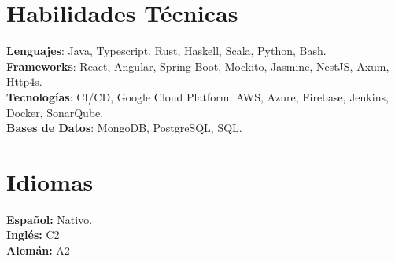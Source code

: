 \documentclass[letterpaper,11pt]{article}
\begin{document}
%
\section{Habilidades Técnicas}
 \begin{itemize}[leftmargin=0.15in, label={}]
    \small{\item{
     \textbf{Lenguajes}{: Java, Typescript, Rust, Haskell, Scala, Python, Bash.} \\
     \textbf{Frameworks}{: React, Angular, Spring Boot, Mockito, Jasmine, NestJS, Axum, Http4s. } \\
     \textbf{Tecnologías}{: CI/CD, Google Cloud Platform, AWS, Azure, Firebase, Jenkins, Docker, SonarQube.} \\
     \textbf{Bases de Datos}{: MongoDB, PostgreSQL, SQL.} \\
    }}
 \end{itemize}

\section{Idiomas}
 \begin{itemize}[leftmargin=0.15in, label={}]
    \small{\item{
     \textbf{Español: }{Nativo.} \\
     \textbf{Inglés: }{C2} \\
     \textbf{Alemán: }{A2} \\
    }}
 \end{itemize}


\end{document}

